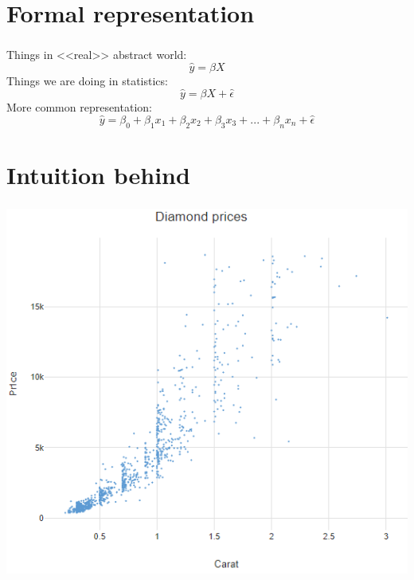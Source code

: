\documentclass[t, 11pt]{beamer}
\begin{document}
	\section{Formal representation}

\begin{frame}
	\frametitle{\insertsection} 
	\framesubtitle{\insertsubsection} 
	
	Things in <<real>> abstract world:
	\begin{equation}
		 \hat{y} = \beta X
	\end{equation}
	Things we are doing in statistics:
	\begin{equation}
		 \hat{y} = \beta X + \hat{\epsilon}
	\end{equation} 
	More common representation: 
	\begin{equation}
	\hat{y} =\beta_0 + \beta_1x_1 + \beta_2x_2 + \beta_3x_3 + ... + \beta_nx_n + \hat{\epsilon}
	\end{equation} 

\end{frame}		

\section{Intuition behind}

\begin{frame}
	\frametitle{\insertsection} 
	\framesubtitle{\insertsubsection} 
	
	\begin{center}
		\includegraphics{DiamondPrices}
	\end{center}

\end{frame}		
\end{document}
